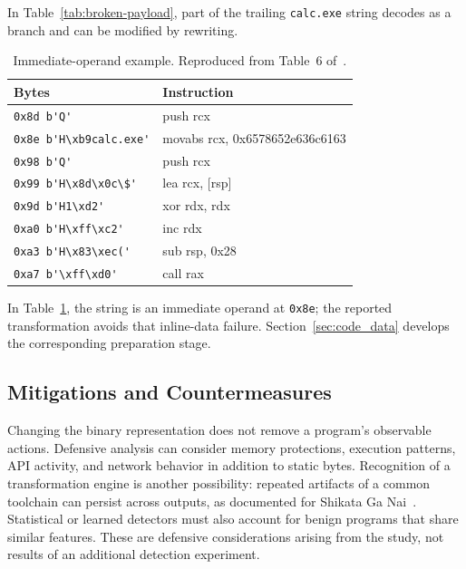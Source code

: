 \documentclass[runningheads]{llncs}
\begin{document}
In Table~\ref{tab:broken-payload}, part of the trailing
\texttt{calc.exe} string decodes as a branch and can be modified by rewriting.

\begin{table}[t]
    \caption{Immediate-operand example. Reproduced from Table~6 of~\cite{zone_secrypt_2026}.}
    \label{tab:functional-payload}
    \small
    \centering
    \setlength{\tabcolsep}{3pt}
    \begin{tabular}{ll}
        \hline
        \textbf{Bytes}                  & \textbf{Instruction} \\ \hline
        \verb|0x8d b'Q'|              &  push     rcx \\ \hline
        \verb|0x8e b'H\xb9calc.exe'|  &  movabs   rcx, 0x6578652e636c6163 \\ \hline
        \verb|0x98 b'Q'|              &  push     rcx \\ \hline
        \verb|0x99 b'H\x8d\x0c\$'|     & lea      rcx, [rsp] \\ \hline
        \verb|0x9d b'H1\xd2'|          & xor      rdx, rdx \\ \hline
        \verb|0xa0 b'H\xff\xc2'|       & inc      rdx \\ \hline
        \verb|0xa3 b'H\x83\xec('|      & sub      rsp, 0x28 \\ \hline
        \verb|0xa7 b'\xff\xd0'|        & call     rax \\ \hline
    \end{tabular}
\end{table}

In Table~\ref{tab:functional-payload}, the string is an immediate
operand at \texttt{0x8e}; the reported transformation avoids that inline-data
failure. Section~\ref{sec:code_data} develops the corresponding preparation stage.

\subsection{Mitigations and Countermeasures}
Changing the binary representation does not remove a program's observable actions. Defensive analysis can consider memory protections, execution patterns, API activity, and network behavior in addition to static bytes. Recognition of a transformation engine is another possibility: repeated artifacts of a common toolchain can persist across outputs, as documented for Shikata Ga Nai~\cite{sgnstrong}. Statistical or learned detectors must also account for benign programs that share similar features. These are defensive considerations arising from the study, not results of an additional detection experiment.
\end{document}
